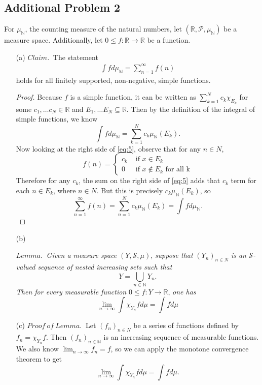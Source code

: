 \documentclass[12pt]{article}
\def\R{\mathbb{R}}
\def\N{\mathbb{N}}
\begin{document}
\subsection*{Additional Problem 2}

For $\mu_\N$, the counting measure of the natural numbers, let $(\R, \mathcal{P}, \mu_\N)$ be a measure space. Additionally, let $0 \leq f: \R \to \R$ be a function.

\begin{itemize}
    \item[(a)] $Claim.~$ The statement
    \begin{align}
        \int f d\mu_\N = \sum_{n = 1}^\infty f(n) \label{eq:5}
    \end{align}
    holds for all finitely supported, non-negative, simple functions.

    \begin{proof}
        Because $f$ is a simple function, it can be written as $\sum_{k=1}^N c_k \chi_{E_k}$ for some $c_1, \ldots c_N \in \R$ and $E_1, \ldots E_N \subseteq \R$. Then by the definition of the integral of simple functions, we know $$\int f d\mu_\N = \sum_{k=1}^N c_k \mu_\N (E_k).$$ Now looking at the right side of \eqref{eq:5}, observe that for any $n \in N$, $$f(n) = \begin{cases}
            c_k &\text{ if } x \in E_k \\
            0 &\text{ if } x \notin E_k \text{ for all k}
        \end{cases}$$
        Therefore for any $c_k$, the sum on the right side of \eqref{eq:5} adds that $c_k$ term for each $n \in E_k$, where $n \in N$. But this is precisely $c_k \mu_\N (E_k)$, so $$\sum_{n=1}^{\infty} f(n) = \sum_{n=1}^{N} c_k \mu_\N (E_k) = \int f d \mu_\N.$$
    \end{proof}

    \item[(b)]
    
    $Lemma.~$ \textit{Given a measure space} $(Y, \mathcal{S}, \mu)$, \textit{suppose that} $(Y_n)_{n \in N}$ \textit{is an} $\mathcal{S}$\textit{-valued sequence of nested increasing sets such that} $$Y = \bigcup_{n \in \N} Y_n.$$ \textit{Then for every measurable function} $0 \leq f : Y \to \R$, \textit{one has} $$\lim_{n \to \infty} \int \chi_{Y_n} f d\mu = \int f d \mu$$
    
    \item[(c)]
    $Proof~of~Lemma.~$ Let $(f_n)_{n \in N}$ be a series of functions defined by $f_n = \chi_{Y_n} f$. Then $(f_n)_{n \in \N}$ is an increasing sequence of measurable functions. We also know $\lim_{n \to \infty} f_n = f$, so we can apply the monotone convergence theorem to get $$ \lim_{n \to \infty} \int \chi_{Y_n} f d \mu = \int f d \mu.$$
\end{itemize}
\end{document}
